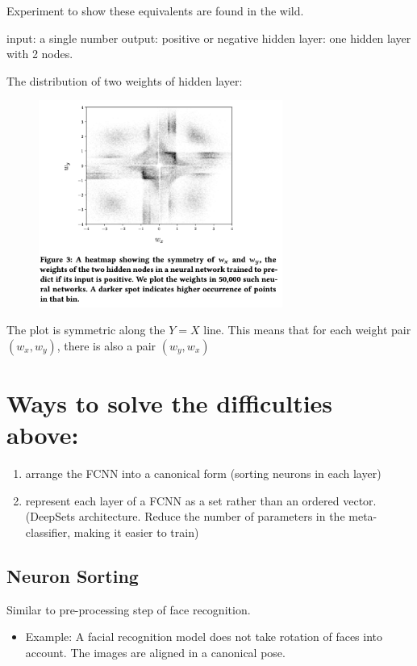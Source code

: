 \documentclass[11pt]{article}
\numberwithin{equation}{section}
\begin{document}
Experiment to show these equivalents are found in the wild.

input: a single number
output: positive or negative
hidden layer: one hidden layer with 2 nodes.

The distribution of two weights of hidden layer:

\begin{figure}[!h]
	\centering
	\includegraphics[width=8cm]{figures/two_hidden_distribution.png}
	\label{fig:property inference model}
\end{figure}

The plot is symmetric along the $Y = X$ line. This means that for each weight pair $(w_x, w_y)$, there is also a pair $(w_y, w_x)$

\section{Ways to solve the difficulties above:}
\begin{enumerate}
    \item arrange the FCNN into a canonical form (sorting neurons in each layer)
    \item represent each layer of a FCNN as a set rather than an ordered vector.(DeepSets architecture. Reduce the number of parameters in the meta-classifier, making it easier to train)
\end{enumerate}

\subsection{Neuron Sorting}

Similar to pre-processing step of face recognition.

\begin{itemize}
    \item Example: A facial recognition model does not take rotation of faces into account. The images are aligned in a canonical pose.
\end{itemize}
\end{document}
